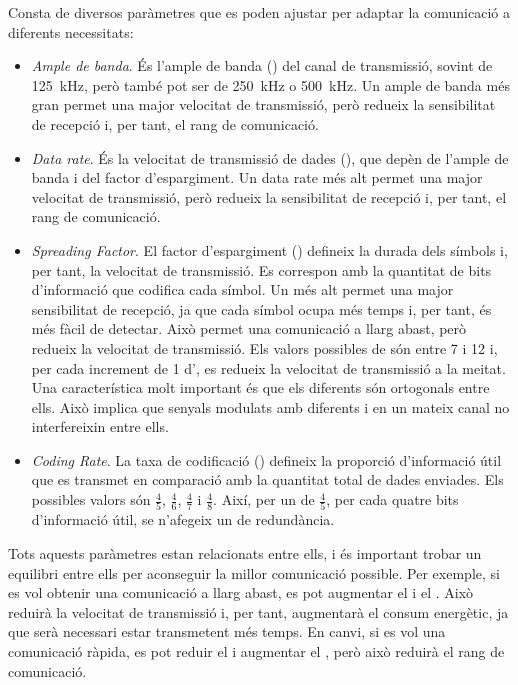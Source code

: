 \documentclass{tfgitic}[2024/07/01]
\begin{document}
Consta de diversos paràmetres que es poden ajustar per adaptar la comunicació a diferents necessitats:
\begin{itemize}
    \item \emph{Ample de banda}. És l'ample de banda () del canal de transmissió, sovint de \SI{125}{\kHz}, però també pot ser de \SI{250}{\kHz} o \SI{500}{\kHz}. Un ample de banda més gran permet una major velocitat de transmissió, però redueix la sensibilitat de recepció i, per tant, el rang de comunicació.
    \item \emph{Data rate}. És la velocitat de transmissió de dades (), que depèn de l'ample de banda i del factor d'espargiment. Un data rate més alt permet una major velocitat de transmissió, però redueix la sensibilitat de recepció i, per tant, el rang de comunicació.
    \item \emph{Spreading Factor}. El factor d'espargiment () defineix la durada dels símbols i, per tant, la velocitat de transmissió. Es correspon amb la quantitat de bits d'informació que codifica cada símbol. Un  més alt permet una major sensibilitat de recepció, ja que cada símbol ocupa més temps i, per tant, és més fàcil de detectar. Això permet una comunicació a llarg abast, però redueix la velocitat de transmissió. Els valors possibles de  són entre 7 i 12 i, per cada increment de 1 d', es redueix la velocitat de transmissió a la meitat. Una característica molt important és que els diferents  són ortogonals entre ells. Això implica que senyals modulats amb diferents  i en un mateix canal no interfereixin entre ells. 
    \item \emph{Coding Rate}. La taxa de codificació () defineix la proporció d'informació útil que es transmet en comparació amb la quantitat total de dades enviades. Els possibles valors són $\frac{4}{5}$, $\frac{4}{6}$, $\frac{4}{7}$ i $\frac{4}{8}$. Així, per un  de $\frac{4}{5}$, per cada quatre bits d'informació útil, se n'afegeix un de redundància.
\end{itemize}

Tots aquests paràmetres estan relacionats entre ells, i és important trobar un equilibri entre ells per aconseguir la millor comunicació possible. Per exemple, si es vol obtenir una comunicació a llarg abast, es pot augmentar el  i el . Això reduirà la velocitat de transmissió i, per tant, augmentarà el consum energètic, ja que serà necessari estar transmetent més temps. En canvi, si es vol una comunicació ràpida, es pot reduir el  i augmentar el , però això reduirà el rang de comunicació.
\end{document}
